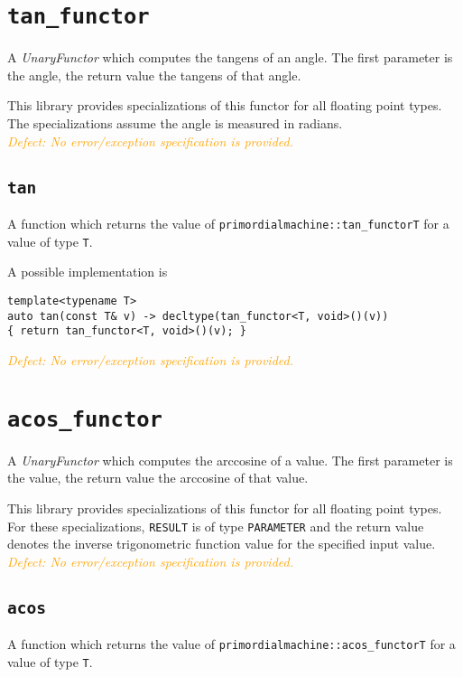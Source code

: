 \documentclass[oneside]{book}
\begin{document}
\section{\texttt{tan\_functor}}
A \textit{UnaryFunctor} which computes the
tangens
of an angle.
The first parameter is the angle, the return value the tangens of that angle.

\noindent{}This library provides specializations of this functor for all floating point types.
The specializations assume the angle is measured in radians.\\

\noindent{}\textcolor{orange}{\textit{Defect: No error/exception specification is provided.}}

\subsection{\texttt{tan}}
A function which returns the value of \texttt{primordialmachine::tan\_functor\textlangle T\textrangle}
for a value of type \texttt{T}.

\noindent{}A possible implementation is
\begin{verbatim}
template<typename T>
auto tan(const T& v) -> decltype(tan_functor<T, void>()(v))
{ return tan_functor<T, void>()(v); }
\end{verbatim}

\noindent{}\textcolor{orange}{\textit{Defect: No error/exception specification is provided.}}

\section{\texttt{acos\_functor}}
A \textit{UnaryFunctor} which computes the
arccosine
of a value.
The first parameter is the value, the return value the arccosine of that value.

\noindent{}This library provides specializations of this functor for all floating point types.
For these specializations, \texttt{RESULT} is of type \texttt{PARAMETER} and the return value
denotes the inverse trigonometric function value for the specified input value.\\

\noindent{}\textcolor{orange}{\textit{Defect: No error/exception specification is provided.}}

\subsection{\texttt{acos}}
A function which returns the value of \texttt{primordialmachine::acos\_functor\textlangle T\textrangle}
for a value of type \texttt{T}.
\end{document}
